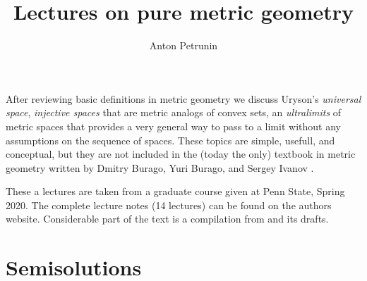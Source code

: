 \documentclass[twoside]{book}
\begin{document}
 
\title{Lectures on pure metric geometry}
\author{Anton Petrunin}
\date{}
\maketitle


After reviewing basic definitions in metric geometry we discuss 
Uryson's \emph{universal space},
\emph{injective spaces} that are metric analogs of convex sets,
an \emph{ultralimits} of metric spaces that provides a very general way to pass to a limit without any assumptions on the sequence of spaces.
These topics are simple, usefull, and conceptual,
but they are not included in the (today the only) textbook in metric geometry written by Dmitry Burago, Yuri Burago, and Sergey Ivanov \cite{burago-burago-ivanov}.

These a lectures are taken from a graduate course given at Penn State, Spring 2020.
The complete lecture notes (14 lectures) can be found on the authors website.
Considerable part of the text is a compilation from \cite{alexander-kapovitch-petrunin-2019, alexander-kapovitch-petrunin-2025, petrunin-yashinski, petrunin-2009, petrunin-zamorabarrera} and its drafts.

\thispagestyle{empty}
\tableofcontents
\thispagestyle{empty}




%
%


\appendix
\chapter{Semisolutions}





{\small\sloppy


\printbibliography[heading=bibintoc]
\fussy
}
\end{document}
